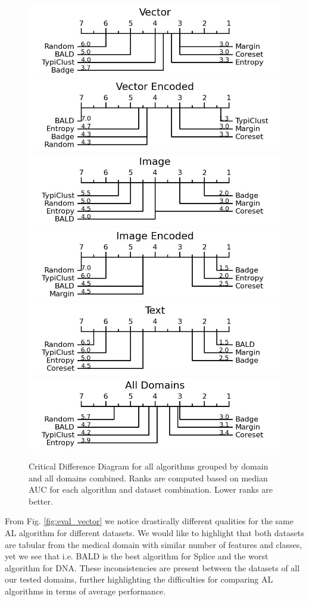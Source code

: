 \documentclass[]{article}
\begin{document}
\begin{figure}
\centering
	\includegraphics[width=0.49\linewidth]{img/macro_vector}
	\includegraphics[width=0.49\linewidth]{img/macro_vector_enc}
	\includegraphics[width=0.49\linewidth]{img/macro_img}
	\includegraphics[width=0.49\linewidth]{img/macro_img_enc}
	\includegraphics[width=0.49\linewidth]{img/macro_text}
	\includegraphics[width=0.49\linewidth]{img/macro_all.jpg}
	\caption{Critical Difference Diagram for all algorithms grouped by domain and all domains combined. Ranks are computed based on median AUC for each algorithm and dataset combination. Lower ranks are better.}
	\label{fig:cd_diagrams}
\end{figure}
%
From Fig. \ref{fig:eval_vector} we notice drastically different qualities for the same AL algorithm for different datasets.
We would like to highlight that both datasets are tabular from the medical domain with similar number of features and classes, yet we see that i.e. BALD is the best algorithm for Splice and the worst algorithm for DNA.
These inconsistencies are present between the datasets of all our tested domains, further highlighting the difficulties for comparing AL algorithms in terms of average performance.
\end{document}
